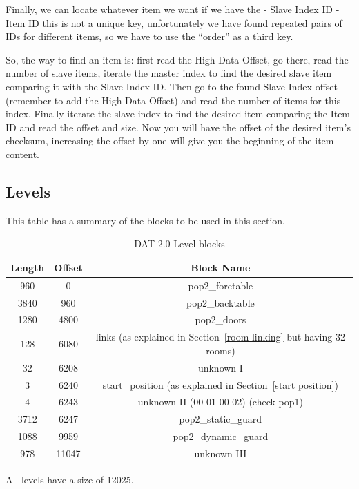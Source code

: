 \documentclass{article}
\begin{document}
 Finally, we can locate whatever item we want if we have the
  - Slave Index ID
  - Item ID
 this is not a unique key, unfortunately we have found repeated pairs of
 IDs for different items, so we have to use the ``order'' as a third key.

 So, the way to find an item is: first read the High Data Offset, go there,
 read the number of slave items, iterate the master index to find the
 desired slave item comparing it with the Slave Index ID. Then go to the
 found Slave Index offset (remember to add the High Data Offset) and read
 the number of items for this index. Finally iterate the slave index to
 find the desired item comparing the Item ID and read the offset and size.
 Now you will have the offset of the desired item's checksum, increasing
 the offset by one will give you the beginning of the item content.

\subsection{Levels}

 This table has a summary of the blocks to be used in this section.

\begin{table}
\begin{tabular}{ccc}
\hline
 Length& Offset & Block Name \\
\hline
 960   & 0      & pop2\_foretable \\
 3840  & 960    & pop2\_backtable \\
 1280  & 4800   & pop2\_doors \\
 128   & 6080   & links (as explained in Section~\ref{room linking} but having 32 rooms) \\
 32    & 6208   & unknown I \\
 3     & 6240   & start\_position (as explained in Section~\ref{start position}) \\
 4     & 6243   & unknown II (00 01 00 02) (check pop1) \\
 3712  & 6247   & pop2\_static\_guard \\
 1088  & 9959   & pop2\_dynamic\_guard \\
 978   & 11047  & unknown III \\
\hline
\end{tabular}
\caption{DAT 2.0 Level blocks}
\label{dat2 level blocks}
\end{table}

 All levels have a size of 12025.
\end{document}
